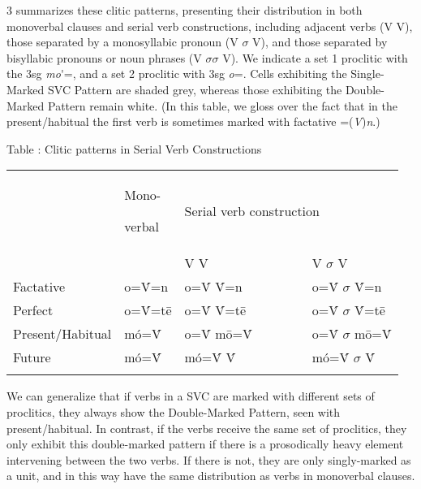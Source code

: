\documentclass[output=paper]{langsci/langscibook}
\begin{document}
3 summarizes these clitic patterns, presenting their distribution in both monoverbal clauses and serial verb constructions, including adjacent verbs (V V), those separated by a monosyllabic pronoun (V $\sigma $ V), and those separated by bisyllabic pronouns or noun phrases (V $\sigma \sigma $ V). We indicate a set 1 proclitic with the 3sg \textit{mo}\'{ }=, and a set 2 proclitic with 3sg \textit{o}=. Cells exhibiting the Single-Marked SVC Pattern are shaded grey, whereas those exhibiting the Double-Marked Pattern remain white. (In this table, we gloss over the fact that in the present/habitual the first verb is sometimes marked with factative =(\textit{V})\textit{n}.)

\begin{stylelsTableHeading}
\label{bkm:Ref448125394}Table : Clitic patterns in Serial Verb Constructions
\end{stylelsTableHeading}

\begin{tabularx}{\textwidth}{XXXXX}
\lsptoprule
\hhline{----~} & {\mdseries Mono-}

{\mdseries verbal} & \multicolumn{2}{X}{{\mdseries Serial verb construction}

} & \\
\hhline{--~~~} &  & {\mdseries V V} & \multicolumn{2}{X}{{\mdseries V $\sigma $ V}

}\\
{\mdseries Factative} & {\mdseries o=\'{V}=n} & {\mdseries o=\'{V} \'{V}=n} & \multicolumn{2}{X}{{\mdseries o=\'{V} $\sigma $ \'{V}=n}

}\\
{\mdseries Perfect} & {\mdseries o=\'{V}=t\={e}} & {\mdseries o=\'{V} \'{V}=t\={e}} & \multicolumn{2}{X}{{\mdseries o=\'{V} $\sigma $ \'{V}=t\={e}}

}\\
{\mdseries Present/Habitual} & {\mdseries mó=\'{V}} & {\mdseries o=\'{V} m\={o}=\'{V}} & \multicolumn{2}{X}{{\mdseries o=\'{V} $\sigma $ m\={o}=\'{V}}

}\\
{\mdseries Future} & {\mdseries mó=\'{V}} & {\mdseries mó=\'{V} \'{V}} & \multicolumn{2}{X}{{\mdseries mó=\'{V} $\sigma $ \'{V}}

}\\
\lspbottomrule
\end{tabularx}
We can generalize that if verbs in a SVC are marked with different sets of proclitics, they always show the Double-Marked Pattern, seen with present/habitual. In contrast, if the verbs receive the same set of proclitics, they only exhibit this double-marked pattern if there is a prosodically heavy element intervening between the two verbs. If there is not, they are only singly-marked as a unit, and in this way have the same distribution as verbs in monoverbal clauses. 
\end{document}
